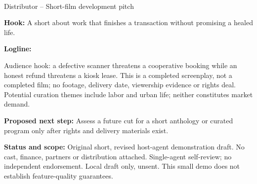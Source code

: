 \documentclass[11pt,letterpaper]{article}
\begin{document}
\begin{center}
{\Large\bfseries\sffamily \filmtitleupper}\\[6pt]
Distributor -- Short-film development pitch
\end{center}
\textbf{Hook:} A short about work that finishes a transaction without promising a healed life.

\textbf{Logline:} \filmlogline

Audience hook: a defective scanner threatens a cooperative booking while an honest refund threatens a kiosk lease. This is a completed screenplay, not a completed film; no footage, delivery date, viewership evidence or rights deal. Potential curation themes include labor and urban life; neither constitutes market demand.

\textbf{Proposed next step:} Assess a future cut for a short anthology or curated program only after rights and delivery materials exist.

\textbf{Status and scope:} Original short, revised host-agent demonstration draft. No cast, finance, partners or distribution attached. Single-agent self-review; no independent endorsement. Local draft only, unsent. This small demo does not establish feature-quality guarantees.
\end{document}
